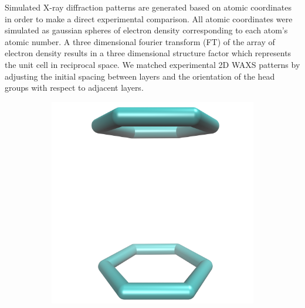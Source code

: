 \documentclass{article}
\begin{document}
  Simulated X-ray diffraction patterns are generated based on atomic
  coordinates in order to make a direct experimental comparison. All atomic
  coordinates were simulated as gaussian spheres of electron density
  corresponding to each atom's atomic number. A three dimensional fourier
  transform (FT) of the array of electron density results in a three dimensional
  structure factor which represents the unit cell in reciprocal space. We matched
  experimental 2D WAXS patterns by adjusting the initial spacing between layers
  and the orientation of the head groups with respect to adjacent layers.

  \begin{figure}
	\centering
	\begin{subfigure}[b]{0.32\textwidth}
		\centering
		\includegraphics[width=\textwidth]{sandwiched.png}
		\caption{}\label{fig:sandwiched}
	\end{subfigure}
	\begin{subfigure}[b]{0.32\textwidth}
		\centering

\end{subfigure}
\end{figure}
\end{document}
